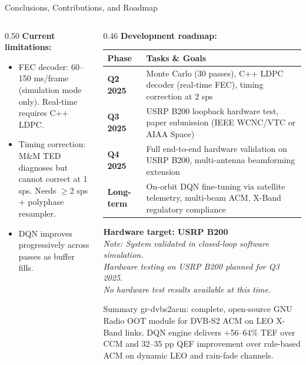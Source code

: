 \documentclass[aspectratio=169,10pt]{beamer}
\begin{document}
\begin{frame}[shrink=12]{Conclusions, Contributions, and Roadmap}
\begin{columns}[T]
\begin{column}{0.50\textwidth}
      \vspace{0.2em}
      \textbf{Current limitations:}
      \begin{itemize}\scriptsize
        \item FEC decoder: 60--150 ms/frame (simulation mode only). Real-time requires C++ LDPC.
        \item Timing correction: M\&M TED diagnoses but cannot correct at 1 sps. Needs $\geq$2 sps + polyphase resampler.
        \item DQN improves progressively across passes as buffer fills.
      \end{itemize}
    \end{column}
    \begin{column}{0.46\textwidth}
      \textbf{Development roadmap:}
      {\scriptsize
      \begin{tabular}{p{1.5cm}p{4.8cm}}
        \toprule
        \textbf{Phase} & \textbf{Tasks \& Goals}\\
        \midrule
        \textbf{Q2 2025} & Monte Carlo (30 passes), C++ LDPC decoder (real-time FEC), timing correction at 2 sps\\
        \textbf{Q3 2025} & USRP B200 loopback hardware test, paper submission (IEEE WCNC/VTC or AIAA Space)\\
        \textbf{Q4 2025} & Full end-to-end hardware validation on USRP B200, multi-antenna beamforming extension\\
        \textbf{Long-term} & On-orbit DQN fine-tuning via satellite telemetry, multi-beam ACM, X-Band regulatory compliance\\
        \bottomrule
      \end{tabular}}

      \vspace{0.3em}
      \textbf{Hardware target: USRP B200}\\
      \scriptsize \textit{Note: System validated in closed-loop software simulation.\\
      Hardware testing on USRP B200 planned for Q3 2025.\\
      No hardware test results available at this time.}

      \vspace{0.3em}
      \begin{resultbox}{Summary}
        \scriptsize gr-dvbs2acm: complete, open-source GNU Radio OOT module for DVB-S2 ACM on LEO X-Band links.
        DQN engine delivers $+$56--64\% TEF over CCM and 32--35 pp QEF improvement over rule-based ACM
        on dynamic LEO and rain-fade channels.
      \end{resultbox}
    \end{column}
  \end{columns}
\end{frame}
\end{document}
